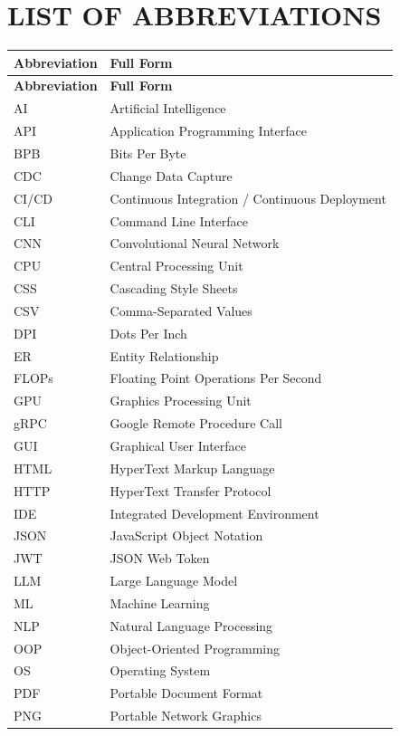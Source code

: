 \documentclass[a4paper,12pt,openany]{report}
\begin{document}
\chapter*{LIST OF ABBREVIATIONS}
\begin{longtable}{p{3cm} p{10cm}}
\textbf{Abbreviation} & \textbf{Full Form} \\
\midrule
\endfirsthead
\textbf{Abbreviation} & \textbf{Full Form} \\
\midrule
\endhead
AI & Artificial Intelligence \\
API & Application Programming Interface \\
BPB & Bits Per Byte \\
CDC & Change Data Capture \\
CI/CD & Continuous Integration / Continuous Deployment \\
CLI & Command Line Interface \\
CNN & Convolutional Neural Network \\
CPU & Central Processing Unit \\
CSS & Cascading Style Sheets \\
CSV & Comma-Separated Values \\
DPI & Dots Per Inch \\
ER & Entity Relationship \\
FLOPs & Floating Point Operations Per Second \\
GPU & Graphics Processing Unit \\
gRPC & Google Remote Procedure Call \\
GUI & Graphical User Interface \\
HTML & HyperText Markup Language \\
HTTP & HyperText Transfer Protocol \\
IDE & Integrated Development Environment \\
JSON & JavaScript Object Notation \\
JWT & JSON Web Token \\
LLM & Large Language Model \\
ML & Machine Learning \\
NLP & Natural Language Processing \\
OOP & Object-Oriented Programming \\
OS & Operating System \\
PDF & Portable Document Format \\
PNG & Portable Network Graphics \\

\end{longtable}
\end{document}
